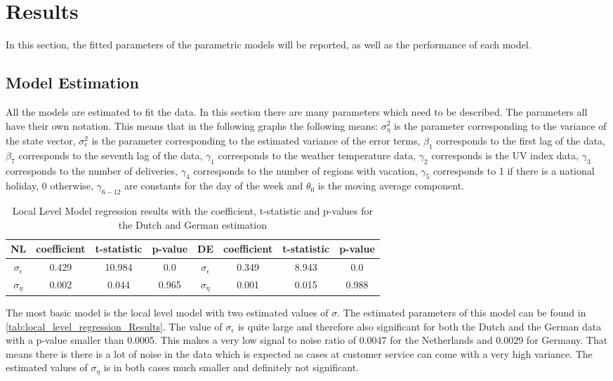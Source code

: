 \section{Results}
\label{seq:results}
In this section, the fitted parameters of the parametric models will be reported, as well as the performance of each model.
\subsection{Model Estimation}
\label{subseq:model estimation}
All the models are estimated to fit the data. In this section there are many parameters which need to be described. The parameters all have their own notation. This means that in the following graphs the following means: $\sigma_{\eta}^2$ is the parameter corresponding to the variance of the state vector, $\sigma_{\epsilon}^2$ is the parameter corresponding to the estimated variance of the error terms, $\beta_1$ corresponds to the first lag of the data, $\beta_7$ corresponds to the seventh lag of the data, $\gamma_1$ corresponds to the weather temperature data, $\gamma_2$ corresponds is the UV index data, $\gamma_3$ corresponds to the number of deliveries, $\gamma_4$ corresponds to the number of regions with vacation, $\gamma_5$ corresponds to 1 if there is a national holiday, 0 otherwise, $\gamma_{6-12}$  are constants for the day of the week and $\theta_0$ is the moving average component.\\

\begin{table}[]
    \centering
    \begin{tabular}{|c|c c c||c|c c c|}\hline
        NL & coefficient & t-statistic & p-value & DE & coefficient & t-statistic & p-value\\\hline        
        $\sigma_{\epsilon}$ & 0.429 & 10.984 & 0.0 & $\sigma_{\epsilon}$ & 0.349 & 8.943 & 0.0\\
        $\sigma_{\eta}$ & 0.002 & 0.044 & 0.965 & $\sigma_{\eta}$ & 0.001 & 0.015 & 0.988\\\hline
    \end{tabular}
    \caption{Local Level Model regression results with the coefficient, t-statistic and p-values for the Dutch and German estimation}
    \label{tab:local_level_regression_Results}
\end{table}
The most basic model is the local level model with two estimated values of $\sigma$. The estimated parameters of this model can be found in \autoref{tab:local_level_regression_Results}. The value of $\sigma_{\epsilon}$ is quite large and therefore also significant for both the Dutch and the German data with a p-value smaller than 0.0005. This makes a very low signal to noise ratio of 0.0047 for the Netherlands and 0.0029 for Germany. That means there is there is a lot of noise in the data which is expected as cases at customer service can come with a very high variance. The estimated values of $\sigma_{\eta}$  is in both cases much smaller and definitely not significant.\\

